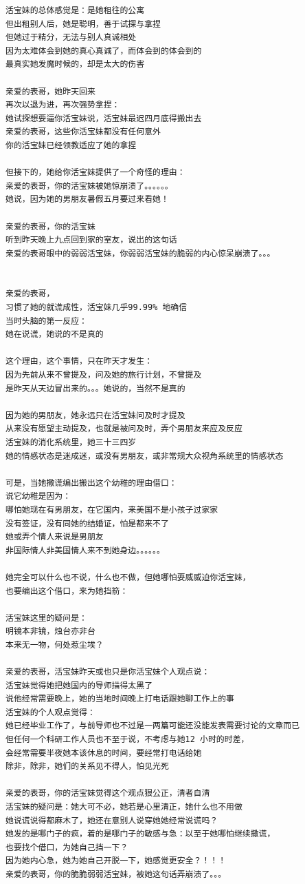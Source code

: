 \documentclass[9pt, b5paper]{article}
\begin{document}
\begin{enumerate}
\begin{verbatim}
活宝妹的总体感觉是：是她租往的公寓
但出租别人后，她是聪明，善于试探与拿捏
但她过于精分，无法与别人真诚相处
因为太难体会到她的真心真诚了，而体会到的体会到的
最真实她发魔时候的，却是太大的伤害

亲爱的表哥，她昨天回来
再次以退为进，再次强势拿捏：
她试探想要逼你活宝妹说，活宝妹最迟四月底得搬出去
亲爱的表哥，这些你活宝妹都没有任何意外
你的活宝妹已经领教适应了她的拿捏

但接下的，她给你活宝妹提供了一个奇怪的理由：
亲爱的表哥，你的活宝妹被她惊崩溃了。。。。。。
她说，因为她的男朋友暑假五月要过来看她！

亲爱的表哥，你的活宝妹
听到昨天晚上九点回到家的室友，说出的这句话
亲爱的表哥眼中的弱弱活宝妹，你弱弱活宝妹的脆弱的内心惊呆崩溃了。。。


亲爱的表哥，
习惯了她的就谎成性，活宝妹几乎99.99% 地确信
当时头脑的第一反应：
她在说谎，她说的不是真的

这个理由，这个事情，只在昨天才发生：
因为先前从来不曾提及，问及她的旅行计划，不曾提及
是昨天从天边冒出来的。。。她说的，当然不是真的

因为她的男朋友，她永远只在活宝妹问及时才提及
从来没有愿望主动提及，也就是被问及时，弄个男朋友来应及反应
活宝妹的消化系统里，她三十三四岁
她的情感状态是迷成迷，或没有男朋友，或非常规大众视角系统里的情感状态

可是，当她撒谎编出搬出这个幼稚的理由借口：
说它幼稚是因为：
哪怕她现在有男朋友，在它国内，来美国不是小孩子过家家
没有签证，没有同她的结婚证，怕是都来不了
她或弄个情人来说是男朋友
非国际情人非美国情人来不到她身边。。。。。。

她完全可以什么也不说，什么也不做，但她哪怕耍威威迫你活宝妹，
也要编出这个借口，来为她挡箭：

活宝妹这里的疑问是：
明镜本非镜，烛台亦非台
本来无一物，何处惹尘埃？

亲爱的表哥，活宝妹昨天或也只是你活宝妹个人观点说：
活宝妹觉得她把她国内的导师描得太黑了
说他经常需要晚上，她的当地时间晚上打电话跟她聊工作上的事
活宝妹的个人观点觉得：
她已经毕业工作了，与前导师也不过是一两篇可能还没能发表需要讨论的文章而已
但任何一个科研工作人员也不至于说，不考虑与她12 小时的时差，
会经常需要半夜她本该休息的时间，要经常打电话给她
除非，除非，她们的关系见不得人，怕见光死

亲爱的表哥，你的活宝妹觉得这个观点狠公正，清者自清
活宝妹的疑问是：她大可不必，她若是心里清正，她什么也不用做
她说谎说得都麻木了，她还在意别人说穿她她经常说谎吗？
她发的是哪门子的疯，着的是哪门子的敏感与急：以至于她哪怕继续撒谎，
也要找个借口，为她自己挡一下？
因为她内心急，她为她自己开脱一下，她感觉更安全？！！！
亲爱的表哥，你的脆脆弱弱活宝妹，被她这句话弄崩溃了。。。


\end{verbatim}
\end{enumerate}
\end{document}
